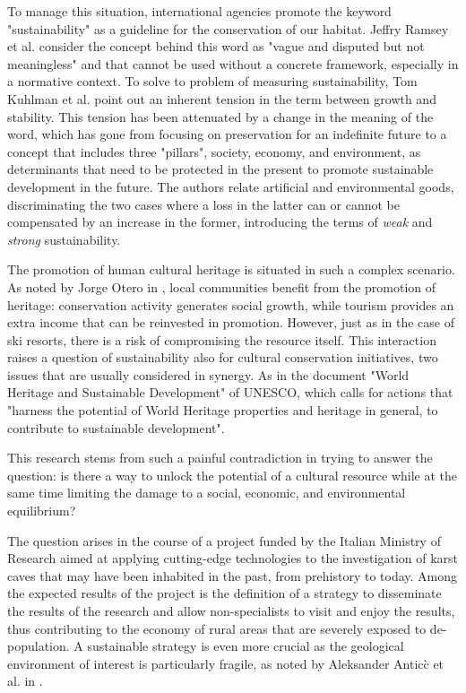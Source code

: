 \documentclass[sustainability,article,submit,pdftex,moreauthors]{Definitions/mdpi}
\begin{document}
To manage this situation, international agencies promote the keyword "sustainability" as a guideline for the conservation of our habitat. Jeffry Ramsey et al. \cite{ram15a} consider the concept behind this word as "vague and disputed but not meaningless" and that cannot be used without a concrete framework, especially in a normative context. To solve to problem of measuring sustainability, Tom Kuhlman et al. \cite{kuh10a} point out an inherent tension in the term between growth and stability. This tension has been attenuated by a change in the meaning of the word, which has gone from focusing on preservation for an indefinite future to a concept that includes three "pillars", society, economy, and environment, as determinants that need to be protected in the present to promote sustainable development in the future. The authors relate artificial and environmental goods, discriminating the two cases where a loss in the latter can or cannot be compensated by an increase in the former, introducing the terms of {\em weak} and {\em strong} sustainability.

The promotion of human cultural heritage is situated in such a complex scenario. As noted by Jorge Otero in \cite{ote22a}, local communities benefit from the promotion of heritage: conservation activity generates social growth, while tourism provides an extra income that can be reinvested in promotion. However, just as in the case of ski resorts, there is a risk of compromising the resource itself. This interaction raises a question of sustainability also for cultural conservation initiatives, two issues that are usually considered in synergy. As in the document "World Heritage and Sustainable Development" of UNESCO, which calls for actions that "harness the potential of World Heritage properties and heritage in general, to contribute to sustainable development".

This research stems from such a painful contradiction in trying to answer the question: is there a way to unlock the potential of a cultural resource while at the same time limiting the damage to a social, economic, and environmental equilibrium?

The question arises in the course of a project funded by the Italian Ministry of Research aimed at applying cutting-edge technologies to the investigation of karst caves that may have been inhabited in the past, from prehistory to today. Among the expected results of the project is the definition of a strategy to disseminate the results of the research and allow non-specialists to visit and enjoy the results, thus contributing to the economy of rural areas that are severely exposed to de-population. A sustainable strategy is even more crucial as the geological environment of interest is particularly fragile, as noted by Aleksander Antic\`c et al. in \cite{ant20a}.
\end{document}
